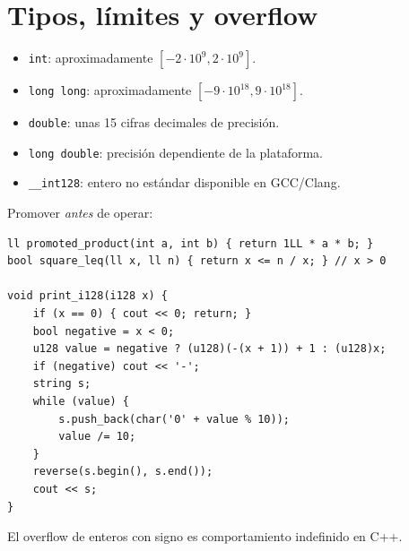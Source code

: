 \section{Tipos, l\'imites y overflow}

\begin{itemize}
  \item \texttt{int}: aproximadamente $[-2\cdot10^9,2\cdot10^9]$.
  \item \texttt{long long}: aproximadamente $[-9\cdot10^{18},9\cdot10^{18}]$.
  \item \texttt{double}: unas 15 cifras decimales de precisi\'on.
  \item \texttt{long double}: precisi\'on dependiente de la plataforma.
  \item \texttt{\_\_int128}: entero no est\'andar disponible en GCC/Clang.
\end{itemize}

Promover \emph{antes} de operar:

\begin{lstlisting}[style=cpp]
ll promoted_product(int a, int b) { return 1LL * a * b; }
bool square_leq(ll x, ll n) { return x <= n / x; } // x > 0

void print_i128(i128 x) {
    if (x == 0) { cout << 0; return; }
    bool negative = x < 0;
    u128 value = negative ? (u128)(-(x + 1)) + 1 : (u128)x;
    if (negative) cout << '-';
    string s;
    while (value) {
        s.push_back(char('0' + value % 10));
        value /= 10;
    }
    reverse(s.begin(), s.end());
    cout << s;
}
\end{lstlisting}

El overflow de enteros con signo es comportamiento indefinido en C++.

